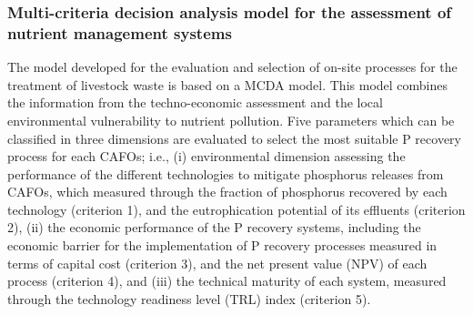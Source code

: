 \begin{refsection}[referencesCh5]


\subsubsection{Multi-criteria decision analysis model for the assessment of nutrient management systems} \label{section:MCDAPRec}
The model developed for the evaluation and selection of on-site processes for the treatment of livestock waste is based on a MCDA model.
This model combines the information from the techno-economic assessment and the local environmental vulnerability to nutrient pollution. Five parameters which can be classified in three dimensions are evaluated to select the most suitable P recovery process for each CAFOs; i.e.,  (i) environmental dimension assessing the performance of the different technologies to mitigate phosphorus releases from CAFOs, which measured through the fraction of phosphorus recovered by each technology (criterion 1), and the eutrophication potential of its effluents (criterion 2), (ii) the economic performance of the P recovery systems, including the economic barrier for the implementation of P recovery processes measured in terms of capital cost (criterion 3), and the net present value (NPV) of each process (criterion 4), and (iii) the technical maturity of each system, measured through the technology readiness level (TRL) index (criterion 5).


\end{refsection}
